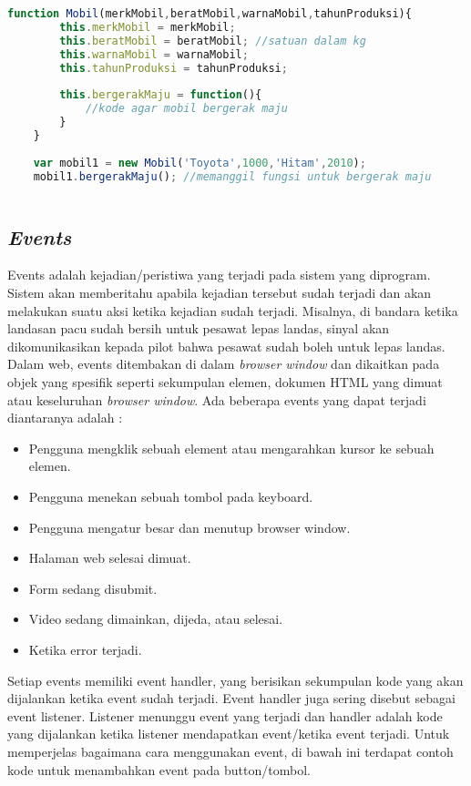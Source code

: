 \begin{lstlisting}[language=Javascript, caption=Membuat dan memanggil method bergerakMaju()]
	function Mobil(merkMobil,beratMobil,warnaMobil,tahunProduksi){
		this.merkMobil = merkMobil;
		this.beratMobil = beratMobil; //satuan dalam kg
		this.warnaMobil = warnaMobil;
		this.tahunProduksi = tahunProduksi;
		
		this.bergerakMaju = function(){
			//kode agar mobil bergerak maju
		}
	}
	
	var mobil1 = new Mobil('Toyota',1000,'Hitam',2010);
	mobil1.bergerakMaju(); //memanggil fungsi untuk bergerak maju
	
\end{lstlisting}

\subsection{\textit{Events}}
Events adalah kejadian/peristiwa yang terjadi pada sistem yang diprogram. Sistem akan memberitahu apabila kejadian tersebut sudah terjadi dan akan melakukan suatu aksi ketika kejadian sudah terjadi. Misalnya, di bandara ketika landasan pacu sudah bersih untuk pesawat lepas landas, sinyal akan dikomunikasikan kepada pilot bahwa pesawat sudah boleh untuk lepas landas. Dalam web, events ditembakan di dalam \textit{browser window} dan dikaitkan pada objek yang spesifik seperti sekumpulan elemen, dokumen HTML yang dimuat atau keseluruhan \textit{browser window}. Ada beberapa events yang dapat terjadi diantaranya adalah : 

\begin{itemize}
	\item Pengguna mengklik sebuah element atau mengarahkan kursor ke sebuah elemen.
	\item Pengguna menekan sebuah tombol pada keyboard.
	\item Pengguna mengatur besar dan menutup browser window.
	\item Halaman web selesai dimuat.
	\item Form sedang disubmit.
	\item Video sedang dimainkan, dijeda, atau selesai.
	\item Ketika error terjadi.
\end{itemize}

Setiap events memiliki event handler, yang berisikan sekumpulan kode yang akan dijalankan ketika event sudah terjadi. Event handler juga sering disebut sebagai event listener. Listener menunggu event yang terjadi dan handler adalah kode yang dijalankan ketika listener mendapatkan event/ketika event terjadi. Untuk memperjelas bagaimana cara menggunakan event, di bawah ini terdapat contoh kode untuk menambahkan event pada button/tombol.

